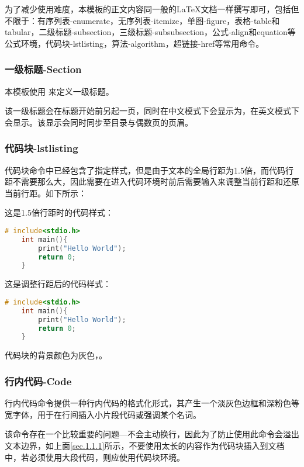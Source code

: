 \documentclass{nitthesis}
\begin{document}
为了减少使用难度，本模板的正文内容同一般的\LaTeX 文档一样撰写即可，包括但不限于：有序列表-enumerate，无序列表-itemize，单图-figure，表格-table和tabular，二级标题-subsection，三级标题-subsubsection，公式-align和equation等公式环境，代码块-lstlisting，算法-algorithm，超链接-href等常用命令。

\subsubsection{一级标题-Section}

本模板使用  来定义一级标题。

该一级标题会在标题开始前另起一页，同时在中文模式下会显示为，在英文模式下会显示。该显示会同时同步至目录与偶数页的页眉。

\subsubsection{代码块-lstlisting}

代码块命令中已经包含了指定样式，但是由于文本的全局行距为1.5倍，而代码行距不需要那么大，因此需要在进入代码环境时前后需要输入来调整当前行距和还原当前行距。如下所示：

这是1.5倍行距时的代码样式：

\begin{lstlisting}[language=C]
    # include<stdio.h>
    int main(){
        print("Hello World");
        return 0;
    }
\end{lstlisting}

这是调整行距后的代码样式：

\linespread{1}
\begin{lstlisting}[language=C]
    # include<stdio.h>
    int main(){
        print("Hello World");
        return 0;
    }
\end{lstlisting}
\linespread{1.5}

代码块的背景颜色为灰色，。

\subsubsection{行内代码-Code}

行内代码命令提供一种行内代码的格式化形式，其产生一个淡灰色边框和深粉色等宽字体，用于在行间插入小片段代码或强调某个名词。

该命令存在一个比较重要的问题---不会主动换行，因此为了防止使用此命令会溢出文本边界，如上面\ref{sec.1.1.1}所示，不要使用太长的内容作为代码块插入到文档中，若必须使用大段代码，则应使用代码块环境。
\end{document}
